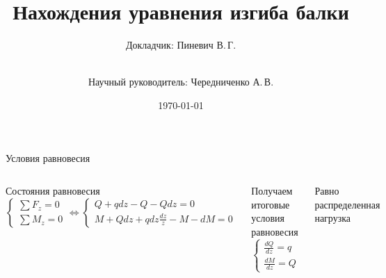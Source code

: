 \documentclass[ignoreonframetext,unicode]{beamer}
\title[Уравнение изгиба балки]{Нахождения уравнения изгиба балки}
\author[Пиневич В.\,Г.]{Докладчик: Пиневич В.\,Г.\and\\[0.5mm] Научный руководитель: Чередниченко А.\,В.}
\institute[каф. Прикладная математика ФН-2]{группа ФН2-41Б}
\date{\today}
\begin{document}
	
	\begin{frame}[plain]
		\maketitle
	\end{frame}

	\begin{frame}{Условия равновесия}
		\begin{columns}
			\column{\textwidth}\vspace*{-2.0mm}
			\begin{block}{Состояния равновесия}\vspace*{-3.5mm}
			 \[
			 	\begin{cases}
			 	\sum\limits {{F_z = 0}} \\
			 	\sum\limits {{M_z = 0}}
			 \end{cases}
			 \Leftrightarrow
			 \begin{cases}
			 	Q + q dz - Q - Q dz = 0 \\
			 	M + Q dz + q dz \frac {dz}{z} - M -dM = 0
			 \end{cases}
			 \]
			\end{block}
			
			\begin{block}{Получаем итоговые условия равновесия}	
			\[
			\begin{cases}
				\frac {dQ}{dz} = q \\
				\frac {dM}{dz} = Q
			\end{cases}
			\]
			\end{block}

		
		Равно распределенная нагрузка
		\begin{columns}
			\includegraphics[width=\textwidth]{pic.1.1}
			\includegraphics[width=\textwidth]{pic.1.2}
		\end{columns}

		\end{columns}
		
	\end{frame}
\end{document}
